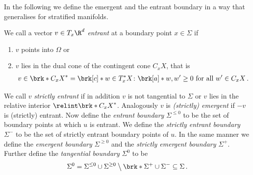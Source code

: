 In the following we define the emergent and the entrant boundary in a way that generalises
\cite[p.282]{Morse1970} for stratified manifolds.
\begin{definition}\label{df:emergentEntrantBd}
  We call a vector $v\in T_x\R^d$ \emph{entrant} at a boundary point $x\in\Sigma$ if
  \begin{enumerate}
    \item $v$ points into $\Omega$ or
    \item $v$ lies in the dual cone of the contingent cone $C_xX$, that is
    \begin{align*}
      v\in \brk*{C_xX}^*=\brk[c]*{w\in T_x^*X\colon \brk[a]*{w, w'}\geq0\text{ for all }w'\in C_xX}\,.
    \end{align*}
  \end{enumerate}
  We call $v$ \emph{strictly entrant} if in addition $v$ is not tangential to $\Sigma$ or $v$ lies in the relative interior $\relint\brk*{C_xX}^*$. 
  Analogously $v$ is \emph{(strictly) emergent} if $-v$ is (strictly) entrant.
  Now define the \emph{entrant boundary} $\Sigma^{\leq0}$ to be the set of boundary points at which $u$ is entrant.
  We define the \emph{strictly entrant boundary} $\Sigma^-$ to be the set of strictly entrant boundary points of $u$.
  In the same manner we define the \emph{emergent boundary} $\Sigma^{\geq0}$ and the \emph{strictly emergent boundary} $\Sigma^+$.
  Further define the \emph{tangential boundary} $\Sigma^0$ to be
  \begin{align}
    \Sigma^0=\Sigma^{\leq0}\cup\Sigma^{\geq0}\bigsetminus\brk*{\Sigma^+\cup\Sigma^-}\subseteq\Sigma\,.
  \end{align}
\end{definition}


